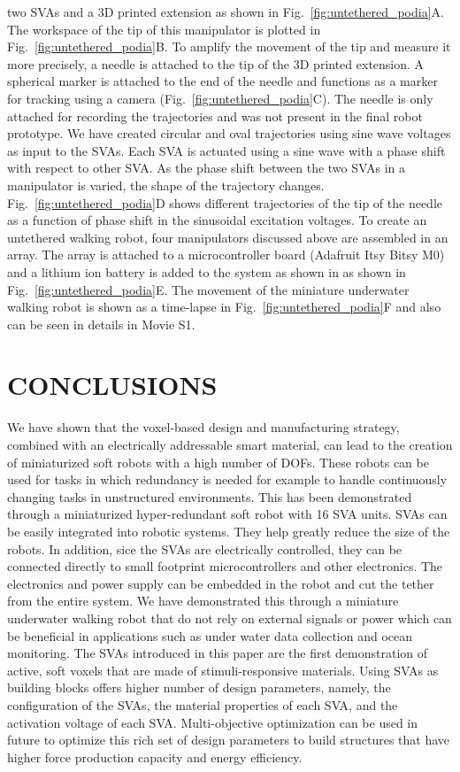 two SVAs and a 3D printed extension as shown in Fig.~\ref{fig:untethered_podia}A. The workspace of the tip of this manipulator is plotted in Fig.~\ref{fig:untethered_podia}B. To amplify the movement of the tip and measure it more precisely, a needle is attached to the tip of the 3D printed extension. A spherical marker is attached to the end of the needle and functions as a marker for tracking using a camera (Fig.~\ref{fig:untethered_podia}C). The needle is only attached for recording the trajectories and was not present in the final robot prototype. We have created circular and oval trajectories using sine wave voltages as input to the SVAs. Each SVA is actuated using a sine wave with a phase shift with respect to other SVA. As the phase shift between the two SVAs in a manipulator is varied, the shape of the trajectory changes. Fig.~\ref{fig:untethered_podia}D shows different trajectories of the tip of the needle as a function of phase shift in the sinusoidal excitation voltages. To create an untethered walking robot, four manipulators discussed above are assembled in an array. The array is attached to a microcontroller board (Adafruit Itsy Bitsy M0) and a lithium ion battery is added to the system as shown in as shown in Fig.~\ref{fig:untethered_podia}E. The movement of the miniature underwater walking robot is shown as a time-lapse in Fig.~\ref{fig:untethered_podia}F and also can be seen in details in Movie S1.
\section{CONCLUSIONS}
We have shown that the voxel-based design and manufacturing strategy, combined with an electrically addressable smart material, can lead to the creation of miniaturized soft robots with a high number of DOFs. These robots can be used for tasks in which redundancy is needed for example to handle continuously changing tasks in unstructured environments. This has been demonstrated through a miniaturized hyper-redundant soft robot with 16 SVA units.
SVAs can be easily integrated into robotic systems. They help greatly reduce the size of the robots. In addition, sice the SVAs are electrically controlled, they can be connected directly to small footprint microcontrollers and other electronics. The electronics and power supply can be embedded in the robot  and cut the tether from the entire system. We have demonstrated this through a miniature underwater walking robot that do not rely on external signals or power which can be beneficial in applications such as under water data collection and ocean monitoring. The SVAs introduced in this paper are the first demonstration of active, soft voxels that are made of stimuli-responsive materials. Using SVAs as building blocks offers higher number of design parameters, namely, the configuration of the SVAs, the material properties of each SVA, and the activation voltage of each SVA. Multi-objective optimization can be used in future to optimize this rich set of design parameters to build structures that have higher force production capacity and %
energy efficiency.

